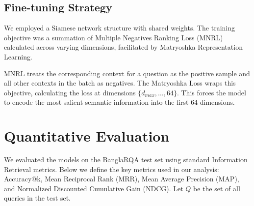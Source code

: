 \documentclass[acmsmall,screen,review]{acmart}
\begin{document}
\subsection{Fine-tuning Strategy}
We employed a Siamese network structure with shared weights. The training objective was a summation of Multiple Negatives Ranking Loss (MNRL) calculated across varying dimensions, facilitated by Matryoshka Representation Learning.

MNRL treats the corresponding context for a question as the positive sample and all other contexts in the batch as negatives. The Matryoshka Loss wraps this objective, calculating the loss at dimensions $\{d_{max}, \dots, 64\}$. This forces the model to encode the most salient semantic information into the first 64 dimensions.

\section{Quantitative Evaluation}

We evaluated the models on the BanglaRQA test set using standard Information Retrieval metrics. Below we define the key metrics used in our analysis: Accuracy@k, Mean Reciprocal Rank (MRR), Mean Average Precision (MAP), and Normalized Discounted Cumulative Gain (NDCG). Let $Q$ be the set of all queries in the test set.
\end{document}
